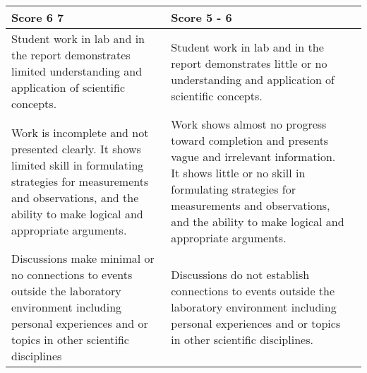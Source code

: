 \begin{table}[htbp]
\begin{tabular}{p{2in}p{2in}p{2in}}
\bottomrule
	
Score 6  7
&Score 5 - 6\\ \midrule

Student work in lab and in the report demonstrates limited understanding and application of scientific concepts.
	&Student work in lab and in the report demonstrates little or no understanding and application of scientific concepts.\\
	\midrule
Work is incomplete and not presented clearly. It shows limited skill in formulating strategies for measurements and observations, and the ability to make logical and appropriate arguments.
	&Work shows almost no progress toward completion and presents vague and irrelevant information. It shows little or no skill in formulating strategies for measurements and observations, and the ability to make logical and appropriate arguments.\\
	\midrule
Discussions make minimal or no connections to events outside the laboratory environment including personal experiences and or topics in other scientific disciplines
	&Discussions do not establish connections to events outside the laboratory environment including personal experiences and or topics in other scientific disciplines.\\
	\bottomrule
\end{tabular}
\end{table}
 
\endinput
